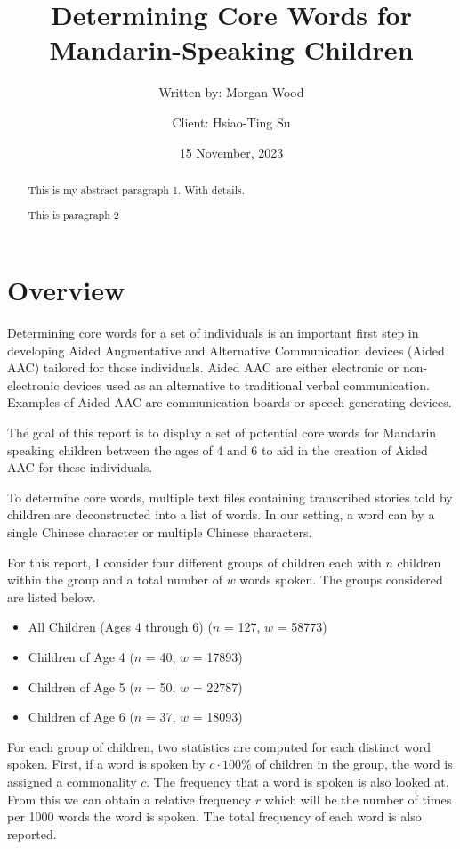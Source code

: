 \documentclass[
]{article}
\title{Determining Core Words for Mandarin-Speaking Children}
\author{Written by: Morgan Wood \and Client: Hsiao-Ting Su}
\date{15 November, 2023}
\begin{document}
\maketitle
\begin{abstract}
This is my abstract paragraph 1. With details.

This is paragraph 2
\end{abstract}

\hypertarget{overview}{%
\section{Overview}\label{overview}}

Determining core words for a set of individuals is an important first
step in developing Aided Augmentative and Alternative Communication
devices (Aided AAC) tailored for those individuals. Aided AAC are either
electronic or non-electronic devices used as an alternative to
traditional verbal communication. Examples of Aided AAC are
communication boards or speech generating devices.

The goal of this report is to display a set of potential core words for
Mandarin speaking children between the ages of 4 and 6 to aid in the
creation of Aided AAC for these individuals.

To determine core words, multiple text files containing transcribed
stories told by children are deconstructed into a list of words. In our
setting, a word can by a single Chinese character or multiple Chinese
characters.

For this report, I consider four different groups of children each with
\(n\) children within the group and a total number of \(w\) words
spoken. The groups considered are listed below.

\begin{itemize}
\item
  All Children (Ages 4 through 6) (\(n\) = 127, \(w\) = 58773)
\item
  Children of Age 4 (\(n\) = 40, \(w\) = 17893)
\item
  Children of Age 5 (\(n\) = 50, \(w\) = 22787)
\item
  Children of Age 6 (\(n\) = 37, \(w\) = 18093)
\end{itemize}

For each group of children, two statistics are computed for each
distinct word spoken. First, if a word is spoken by \(c\cdot100\%\) of
children in the group, the word is assigned a commonality \(c\). The
frequency that a word is spoken is also looked at. From this we can
obtain a relative frequency \(r\) which will be the number of times per
1000 words the word is spoken. The total frequency of each word is also
reported.
\end{document}
